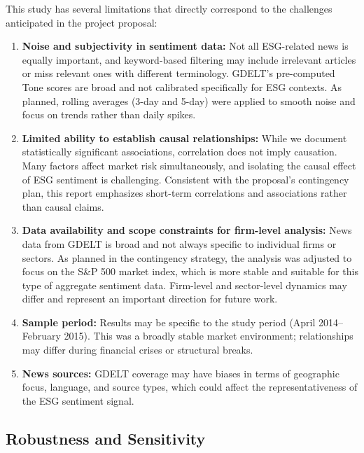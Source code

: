 \documentclass[12pt,a4paper]{article}
\begin{document}
This study has several limitations that directly correspond to the challenges anticipated in the project proposal:

\begin{enumerate}[itemsep=0.5em]
    \item \textbf{Noise and subjectivity in sentiment data:} Not all ESG-related news is equally important, and keyword-based filtering may include irrelevant articles or miss relevant ones with different terminology. GDELT's pre-computed Tone scores are broad and not calibrated specifically for ESG contexts. As planned, rolling averages (3-day and 5-day) were applied to smooth noise and focus on trends rather than daily spikes.
    
    \item \textbf{Limited ability to establish causal relationships:} While we document statistically significant associations, correlation does not imply causation. Many factors affect market risk simultaneously, and isolating the causal effect of ESG sentiment is challenging. Consistent with the proposal's contingency plan, this report emphasizes short-term correlations and associations rather than causal claims.
    
    \item \textbf{Data availability and scope constraints for firm-level analysis:} News data from GDELT is broad and not always specific to individual firms or sectors. As planned in the contingency strategy, the analysis was adjusted to focus on the S\&P 500 market index, which is more stable and suitable for this type of aggregate sentiment data. Firm-level and sector-level dynamics may differ and represent an important direction for future work.
    
    \item \textbf{Sample period:} Results may be specific to the study period (April 2014--February 2015). This was a broadly stable market environment; relationships may differ during financial crises or structural breaks.
    
    \item \textbf{News sources:} GDELT coverage may have biases in terms of geographic focus, language, and source types, which could affect the representativeness of the ESG sentiment signal.
\end{enumerate}

\subsection{Robustness and Sensitivity}
\label{subsec:robustness}
\end{document}
